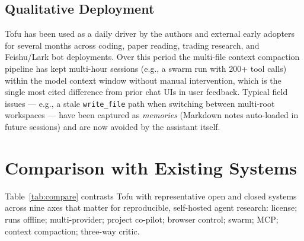 \documentclass[11pt]{article}
\begin{document}
\subsection{Qualitative Deployment}

Tofu has been used as a daily driver by the authors and external early
adopters for several months across coding, paper reading, trading
research, and Feishu/Lark bot deployments. Over this period the
multi-file context compaction pipeline has kept multi-hour sessions
(e.g., a swarm run with 200+ tool calls) within the model context
window without manual intervention, which is the single most cited
difference from prior chat UIs in user feedback. Typical field issues
--- e.g., a stale \texttt{write\_file} path when switching between
multi-root workspaces --- have been captured as \emph{memories}
(Markdown notes auto-loaded in future sessions) and are now avoided by
the assistant itself.

\section{Comparison with Existing Systems}

Table~\ref{tab:compare} contrasts Tofu with representative open and
closed systems across nine axes that matter for reproducible,
self-hosted agent research: license; runs offline; multi-provider;
project co-pilot; browser control; swarm; MCP; context compaction;
three-way critic.
\end{document}
